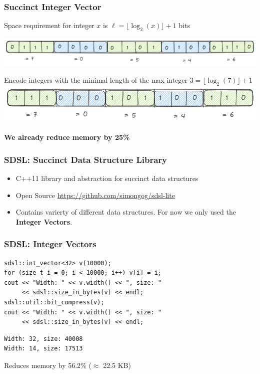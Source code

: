 \documentclass{beamer}
\begin{document}
\begin{frame}
    \frametitle{Succinct Integer Vector}
    \centering
    Space requirement for integer $x$ is $\ell = \lfloor \log_2(x) \rfloor + 1$ bits

    \includegraphics[width=\framewidth]{figures/excalidraw/bit-int-vector.png}
    \pause

    Encode integers with the minimal length of the max integer $3 = \lfloor \log_2(7) \rfloor + 1$ \\
    \vspace{0.5cm} 
    \includegraphics[width=0.75\framewidth]{figures/excalidraw/bit-compressed-int-vector.png}

    \vspace{0.5cm}
    \textbf{We already reduce memory by 25\%}
\end{frame}


\begin{frame}
    \frametitle{SDSL: Succinct Data Structure Library}

    \begin{itemize}
        \item C++11 library and abstraction for succinct data structures
        \item Open Source \url{https://github.com/simongog/sdsl-lite}
        \item Contains varierty of different data structures. For now we only used the \textbf{Integer Vectors}.
    \end{itemize}
\end{frame}


\begin{frame}[fragile]
    \frametitle{SDSL: Integer Vectors}

\begin{lstlisting}[style=C++]
sdsl::int_vector<32> v(10000);
for (size_t i = 0; i < 10000; i++) v[i] = i;
cout << "Width: " << v.width() << ", size: " 
     << sdsl::size_in_bytes(v) << endl;
sdsl::util::bit_compress(v);
cout << "Width: " << v.width() << ", size: " 
     << sdsl::size_in_bytes(v) << endl;
\end{lstlisting}

\pause

\begin{lstlisting}[style=shell]
Width: 32, size: 40008
Width: 14, size: 17513
\end{lstlisting}

\pause

\begin{center}
    Reduces memory by 56.2\% ($\approx$ 22.5 KB)
\end{center}
\end{frame}
\end{document}
